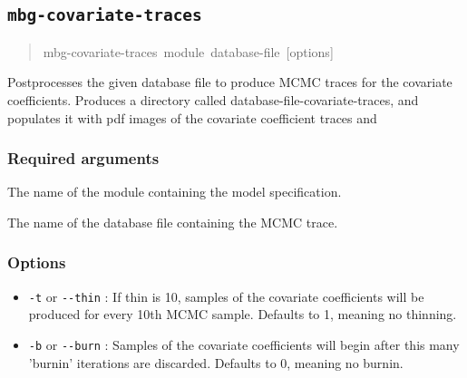 


\subsection{\texttt{mbg-covariate-traces}}
\label{sec:mbg-covariate-traces}
\begin{quote}{\ttfamily \raggedright \noindent
mbg-covariate-traces~module~database-file~{[}options{]}
}\end{quote}

Postprocesses the given database file to produce MCMC traces for the covariate
coefficients. Produces a directory called database-file-covariate-traces, and populates
it with pdf images of the covariate coefficient traces and





\subsubsection{Required arguments}
\label{sec:id2}
\setcounter{listcnt0}{0}
\begin{list}{.}
{
\setlength{\rightmargin}{\leftmargin}
}
\item {} 
The name of the module containing the model specification.

\item {} 
The name of the database file containing the MCMC trace.

\end{list}





\subsubsection{Options}
\label{sec:id3}
\begin{itemize}
\item {} 
\texttt{-t} or \texttt{-{}-thin} : If thin is 10, samples of the covariate coefficients will be
produced for every 10th MCMC sample. Defaults to 1, meaning no thinning.

\item {} 
\texttt{-b} or \texttt{-{}-burn} : Samples of the covariate coefficients will begin after this
many 'burnin' iterations are discarded. Defaults to 0, meaning no burnin.

\end{itemize}


